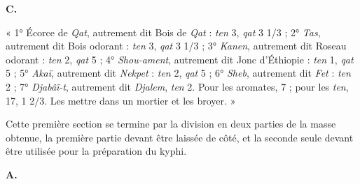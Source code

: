 \documentclass[a4paper, 11pt, oneside]{article}
\newcommand*\hieroAAAB{}
\newcommand*\hieroAAAH{}
\newcommand*\hieroAAAL{}
\newcommand*\hieroAAAM{}
\newcommand*\hieroAAAR{}
\newcommand*\hieroAABB{}
\newcommand*\hieroAABT{}
\newcommand*\hieroAABV{}
\newcommand*\hieroAACM{}
\newcommand*\hieroAACQ{}
\newcommand*\hieroAADK{}
\newcommand*\hieroAADS{}
\newcommand*\hieroAADT{}
\newcommand*\hieroAAFM{}
\newcommand*\hieroAAFN{}
\newcommand*\hieroAAFO{\raisebox{0.5ex}{}}
\newcommand*\hieroAAFS{}
\newcommand*\hieroAAGA{}
\newcommand*\hieroAAGB{}
\newcommand*\hieroAAGC{}
\newcommand*\hieroAAGD{}
\newcommand*\hieroAAGE{}
\newcommand*\hieroAAGK{}
\newcommand*\hieroAAHD{}
\newcommand*\hieroAAHE{}
\newcommand*\hieroAAHF{}
\newcommand*\hieroAAHG{}
\newcommand*\hieroAAHH{}
\newcommand*\hieroAAHI{}
\newcommand*\hieroAAHJ{}
\newcommand*\hieroAAHK{}
\newcommand*\hieroAAHL{}
\newcommand*\hieroAAHM{}
\newcommand*\hieroAAHN{}
\newcommand*\hieroAAHO{\raisebox{0.6ex}{}}
\newcommand*\hieroAAHP{}
\newcommand*\hieroAAHQ{}
\newcommand*\hieroAAHR{}
\newcommand*\hieroAAHS{}
\newcommand*\hieroAAHT{}
\newcommand*\hieroAAHU{\raisebox{0.7ex}{}}
\newcommand*\hieroAAHV{}
\newcommand*\hieroAAHW{}
\newcommand*\hieroAAHX{}
\newcommand*\hieroAAHY{}
\newcommand*\hieroAAHZ{}
\newcommand*\hieroAAIA{}
\newcommand*\hieroAAIB{\raisebox{1ex}{}}
\newcommand*\hieroAAIC{}
\newcommand*\hieroAAID{}
\newcommand*\hieroAAIE{}
\newcommand*\hieroAAIF{}
\newcommand*\hieroAAIG{}
\newcommand*\hieroAAIH{}
\newcommand*\hieroAAII{}
\newcommand*\hieroAAIJ{}
\newcommand*\hieroAAIK{\raisebox{0.3ex}{}}
\newcommand*\hieroAAIL{}
\newcommand*\hieroAAIM{}
\newcommand*\hieroAAIN{}
\newcommand*\hieroAAIO{}
\newcommand*\hieroAAIP{}
\newcommand*\hieroAAIQ{}
\newcommand*\hieroAAIR{}
\newcommand*\hieroAAIS{}
\newcommand*\hieroAAIT{}
\newcommand*\hieroAAIU{}
\newcommand*\hieroAAIV{}
\begin{document}
\hspace*{10mm}\textbf{C.}\hspace*{5mm} $\hieroAAHD\:\hieroAAHE\:\hieroAAHF\:\hieroAAHG\:\hieroAAGD\:\hieroAAHH\:\hieroAAHI\:\hieroAAHF\:\hieroAAHG\:\hieroAAGD\:\hieroAAFM\:\hieroAAGA\:\hieroAAHJ\:\hieroAAHK$ \hspace*{5mm} $\hieroAAGB\:\hieroAAGC\:\hieroAAGD\:\hieroAAHH\:\hieroAAHL\:\hieroAADK\:\hieroAADK\:\hieroAABV\:\hieroAAFM\:\hieroAAGA\:\hieroAAHJ\:\hieroAAHK$ \hspace*{5mm} $\hieroAAHM\:\hieroAAGD\:\hieroAAHH\:\hieroAAAH\:\hieroAABB\:\hieroAAFS\:\hieroAAGD\:\hieroAADK\:\hieroAADK\:\hieroAAHN\:\hieroAAGA\:\hieroAAHO$ \hspace*{5mm} $\hieroAACM\:\hieroAAFN\:\hieroAAHP\:\hieroAAHH\:\hieroAAHQ\:\hieroAAFO\:\hieroAAHR\:\hieroAAHS\:\hieroAAHT\:\hieroAAHU\:\hieroAAGA\:\hieroAAHO$ \hspace*{5mm} $\hieroAAGE\:\hieroAAAB\:\hieroAAAM\:\hieroAAAM\:\hieroAABV\:\hieroAAHH\:\hieroAAHV\:\hieroAAHW\:\hieroAAHN\:\hieroAAGA\:\hieroAAHO$ \hspace*{5mm} $\hieroAAHX\:\hieroAAHW\:\hieroAAHH\:\hieroAAHY\:\hieroAAFO\:\hieroAAHN$ \hspace*{5mm} $\hieroAAGK\:\hieroAAGD\:\hieroAAHH\:\hieroAAHZ\:\hieroAAIA\\\hieroAAFO\:\hieroAAHN\:\hieroAAIB\:\hieroAADS\:\hieroAADT\:\hieroAAAR\:\hieroAAIC\:\hieroAAID\:\hieroAAIE\:\hieroAAIF\:\hieroAAGA\:\hieroAAIG\:\hieroAAAM\:\hieroAAAL\:\hieroAABT\:\hieroAAIH\:\hieroAAII\:\hieroAAIJ\:\hieroAAIK\:\hieroAAAM\:\hieroAAIL\:\hieroAAIM\:\hieroAAIN$

« 1° Écorce de \emph{Qat}, autrement dit Bois de \emph{Qat} : \emph{ten} 3, \emph{qat} 3 1/3 ; 2° \emph{Tas}, autrement dit Bois odorant : \emph{ten} 3, \emph{qat} 3 1/3 ; 3° \emph{Kanen}, autrement dit Roseau odorant : \emph{ten} 2, \emph{qat} 5 ; 4° \emph{Shou-ament}, autrement dit Jonc d'Éthiopie : \emph{ten} 1, \emph{qat} 5 ; 5° \emph{Akaï}, autrement dit \emph{Nekpet} : \emph{ten} 2, \emph{qat} 5 ; 6° \emph{Sheb}, autrement dit \emph{Fet} : \emph{ten} 2 ; 7° \emph{Djabâï-t}, autrement dit \emph{Djalem}, \emph{ten} 2. Pour les aromates, 7 ; pour les \emph{ten}, 17, 1 2/3. Les mettre dans un mortier et les broyer. »

Cette première section se termine par la division en deux parties de la masse obtenue, la première partie devant être laissée de côté, et la seconde seule devant être utilisée pour la préparation du kyphi.

\hspace*{10mm}\textbf{A.}\hspace*{5mm} $\hieroAACQ\:\hieroAAIO\:\hieroAAIP\:\hieroAAIQ\:\hieroAAIR\:\hieroAAIS\:\hieroAAIT\:\hieroAAIU\:\hieroAAGA\:\hieroAAIV$
\end{document}
